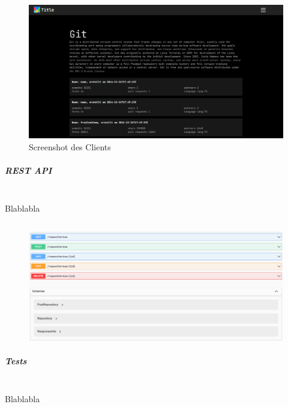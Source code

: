 \documentclass[notitlepage, hidelinks]{article}
\begin{document}
\begin{figure}[H]
\centering
  \includegraphics[width=\textwidth]{images/client.png}
  \caption{Screenshot des Clients}
  \label{fig:clientscreenshot}
\end{figure}

\subparagraph{REST API} \mbox{} \\
Blablabla

\begin{lstlisting}[language=SQL,frame=single,caption=cargo.toml Datei zur Organisation der Abhängigkeiten in Rust,label=toml]

\end{lstlisting}


\begin{figure}[H]
\centering
  \includegraphics[width=\textwidth]{images/swagger.png}
  \caption{}
  \label{fig:apione}
\end{figure}


\subparagraph{Tests}  \mbox{} \\
Blablabla
\end{document}
